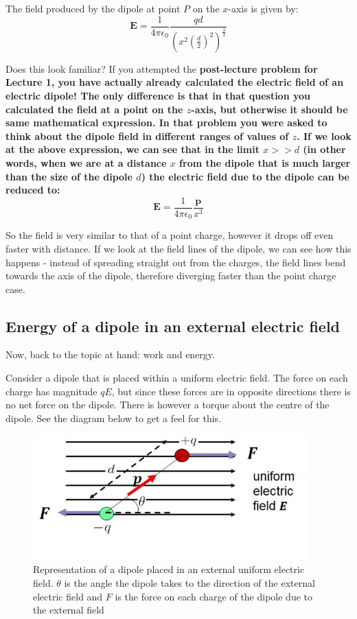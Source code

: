 \documentclass[
  letterpaper,
  DIV=11,
  numbers=noendperiod]{scrreprt}
\begin{document}
The field produced by the dipole at point \(P\) on the \(x\)-axis is
given by: \[
\mathrm{\mathbf{E}}= \frac{1}{4\pi \epsilon_0} \frac{qd}{ \left( x^2 \left( \frac{d}{2} \right)^2 \right)^{\frac{3}{2}} }
\]

Does this look familiar? If you attempted the
\bf{post-lecture problem for Lecture 1}, you have actually already calculated the electric field of an electric dipole! The only difference is that in that question you calculated the field at a point on the $z$-axis, but otherwise it should be same mathematical expression. In that problem you were asked to think about the dipole field in different ranges of values of $z$. If we look at the above expression, we can see that in the limit $x >> d$ (in other words, when we are at a distance $x$ from the dipole that is much larger than the size of the dipole $d$) the electric field due to the dipole can be reduced to:
$$
\mathrm{\mathbf{E}}= \frac{1}{4 \pi \epsilon_0} \frac{\mathrm{\mathbf{p}}}{x^3}
$$ 

So the field is very similar to that of a point charge, however it drops
off even faster with distance. If we look at the field lines of the
dipole, we can see how this happens - instead of spreading straight out
from the charges, the field lines bend towards the axis of the dipole,
therefore diverging faster than the point charge case.

\subsection{Energy of a dipole in an external electric
field}\label{energy-of-a-dipole-in-an-external-electric-field}

Now, back to the topic at hand: work and energy.

Consider a dipole that is placed within a uniform electric field. The
force on each charge has magnitude \(qE\), but since these forces are in
opposite directions there is no net force on the dipole. There is
however a torque about the centre of the dipole. See the diagram below
to get a feel for this.

\begin{figure}[H]

{\centering \includegraphics[width=4.16667in,height=\textheight]{Figures/dipole_extE.jpg}

}

\caption{Representation of a dipole placed in an external uniform
electric field. \(\theta\) is the angle the dipole takes to the
direction of the external electric field and \(F\) is the force on each
charge of the dipole due to the external field}

\end{figure}%
\end{document}

